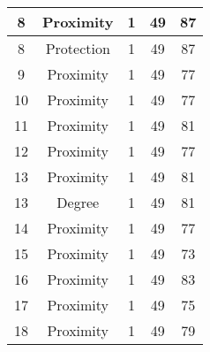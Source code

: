 \documentclass[results.tex]{subfiles}
\begin{document}
\begin{center}
\begin{tabular}{| c || c | c | c | c |}
            \hline
            8                       & Proximity                    & 1                      & 49                      & 87                   \\
            \hline
            8                       & Protection                   & 1                      & 49                      & 87                   \\
            \hline
            9                       & Proximity                    & 1                      & 49                      & 77                   \\
            \hline
            10                      & Proximity                    & 1                      & 49                      & 77                   \\
            \hline
            11                      & Proximity                    & 1                      & 49                      & 81                   \\
            \hline
            12                      & Proximity                    & 1                      & 49                      & 77                   \\
            \hline
            13                      & Proximity                    & 1                      & 49                      & 81                   \\
            \hline
            13                      & Degree                       & 1                      & 49                      & 81                   \\
            \hline
            14                      & Proximity                    & 1                      & 49                      & 77                   \\
            \hline
            15                      & Proximity                    & 1                      & 49                      & 73                   \\
            \hline
            16                      & Proximity                    & 1                      & 49                      & 83                   \\
            \hline
            17                      & Proximity                    & 1                      & 49                      & 75                   \\
            \hline
            18                      & Proximity                    & 1                      & 49                      & 79                   \\

\end{tabular}
\end{center}
\end{document}
